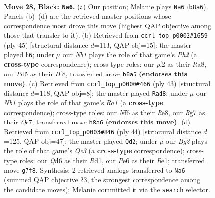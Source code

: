 \documentclass[11pt]{article}
\begin{document}
\clearpage

\begin{figure}[p]\centering
\begin{subfigure}{0.46\textwidth}\centering
\resizebox{\linewidth}{!}{%
\newchessgame
\chessboard[
  setfen={rnbr4/pp3pbk/3qpnp1/P2p2Bp/B2P3P/6P1/RPPNQPK1/1N2R3 b - - 10 28},
  showmover=false,
  pgfstyle=straightmove, color=movearrow, markmove={b8-a6}
]}
\caption{}
\end{subfigure}\hfill
\begin{subfigure}{0.46\textwidth}\centering
\resizebox{\linewidth}{!}{%
\newchessgame
\chessboard[
  setfen={r4bk1/1bqn1p1p/p2p2p1/P1pP1n2/2B2B2/R1NQ1N1P/1P3PP1/6K1 b - - 10 23},
  showmover=false,
  pgfstyle=straightmove, color=movearrow, markmove={h7-h6}
]}
\caption{}
\end{subfigure}
\\[4pt]
\begin{subfigure}{0.46\textwidth}\centering
\resizebox{\linewidth}{!}{%
\newchessgame
\chessboard[
  setfen={r3r1k1/1pqb1p2/2ppn2p/p3b1p1/2P1P1P1/1P2BPP1/P2QN1BK/1R2R3 b - - 3 22},
  showmover=false,
  pgfstyle=straightmove, color=movearrow, markmove={a8-d8}
]}
\caption{}
\end{subfigure}\hfill
\begin{subfigure}{0.46\textwidth}\centering
\resizebox{\linewidth}{!}{%
\newchessgame
\chessboard[
  setfen={3rnr2/kp1b1pp1/p3p3/q1bpP1N1/3N1PBp/P3Q2P/1PP3P1/1K1RR3 w - - 6 23},
  showmover=false,
  pgfstyle=straightmove, color=movearrow, markmove={e3-d2}
]}
\caption{}
\end{subfigure}
\caption{\textbf{Move 28, Black: \texttt{Na6}.} (a) Our position; Melanie plays \texttt{Na6} (\texttt{b8a6}). Panels (b)--(d) are the retrieved master positions whose correspondence most drove this move (highest QAP objective among those that transfer to it). (b) Retrieved from \texttt{ccrl\_top\_p0002\#1659} (ply 45) [structural distance $d$=113, QAP obj=15]: the master played \texttt{h6}; under $\mu$ our \emph{Nb1} plays the role of that game's \emph{Ph2} (a \textbf{cross-type} correspondence); cross-type roles: our \emph{p}f2 as their \emph{R}a8, our \emph{P}d5 as their \emph{B}f8; transferred move \texttt{b8a6} \textbf{(endorses this move)}. (c) Retrieved from \texttt{ccrl\_top\_p0000\#466} (ply 43) [structural distance $d$=118, QAP obj=8]: the master played \texttt{Rad8}; under $\mu$ our \emph{Nb1} plays the role of that game's \emph{Ra1} (a \textbf{cross-type} correspondence); cross-type roles: our \emph{N}f6 as their \emph{R}e8, our \emph{B}g7 as their \emph{Q}c7; transferred move \texttt{b8a6} \textbf{(endorses this move)}. (d) Retrieved from \texttt{ccrl\_top\_p0003\#846} (ply 44) [structural distance $d$=125, QAP obj=47]: the master played \texttt{Qd2}; under $\mu$ our \emph{Bg2} plays the role of that game's \emph{Qe3} (a \textbf{cross-type} correspondence); cross-type roles: our \emph{Q}d6 as their \emph{R}d1, our \emph{P}e6 as their \emph{R}e1; transferred move \texttt{g7f8}. Synthesis: 2 retrieved analogs transferred to \texttt{Na6} (summed QAP objective 23, the strongest correspondence among the candidate moves); Melanie committed it via the \texttt{search} selector.}
\label{fig:thought-m55}
\end{figure}
\end{document}

